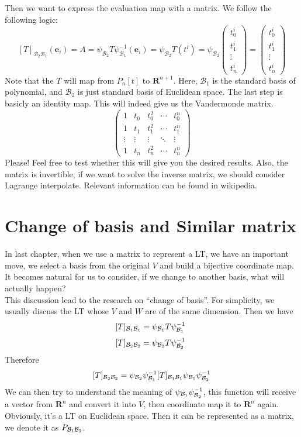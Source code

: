 Then we want to express the evaluation map with a matrix. We follow the following logic:
$$[T]_{\mathcal{B}_2\mathcal{B}_1}(\mathbf{e}_i) = A = \psi_{\mathcal{B}_2}T\psi_{\mathcal{B}_1}^{-1}(\mathbf{e}_i) = \psi_{\mathcal{B}_2}T(t^{i}) = \psi_{\mathcal{B}_2}\begin{pmatrix}
    t_0^i\\t_1^i \\ \vdots \\t_n^i
\end{pmatrix} = \begin{pmatrix}
    t_0^i\\t_1^i \\ \vdots \\t_n^i
\end{pmatrix}$$
Note that the $T$ will map from $P_n[t]$ to $\mathbf{R}^{n+1}$. Here, $\mathcal{B}_1$ is the standard basis of polynomial, and $\mathcal{B}_2$ is just standard basis of Euclidean space. The last step is basicly an identity map. This will indeed give us the Vandermonde matrix.\\
$$
\begin{pmatrix}
    1 & t_0 & t_0^2 & \cdots & t_0^n\\
    1 & t_1 & t_1^2 & \cdots & t_1^n\\
    \vdots & \vdots & \vdots & \ddots & \vdots\\
    1 & t_n & t_n^2 & \cdots & t_n^n
\end{pmatrix}
$$
Please! Feel free to test whether this will give you the desired results. Also, the matrix is invertible, if we want to solve the inverse matrix, we should consider Lagrange interpolate. Relevant information can be found in wikipedia.

\section{Change of basis and Similar matrix}

In last chapter, when we use a matrix to represent a LT, we have an important move, we select a basis from the original $V$ and build a bijective coordinate map. It becomes natural for us to consider, if we change to another basis, what will actually happen? \\

This discussion lead to the research on ``change of basis''. For simplicity, we usually discuss the LT whose $V$ and $W$ are of the same dimension. Then we have
$$[T]_{\B_1 \B_1} = \psi_{\B_1}T\psi_{\B_1}^{-1}\ $$
$$[T]_{\mathcal{B}_2 \mathcal{B}_2} = \psi_{\mathcal{B}_2}T\psi_{\mathcal{B}_2}^{-1}\ $$
Therefore
$$[T]_{\mathcal{B}_2 \mathcal{B}_2} = \psi_{\mathcal{B}_2}\psi_{\mathcal{B}_1}^{-1}[T]_{\mathcal{B}_1 \mathcal{B}_1}\psi_{\mathcal{B}_1}\psi_{\mathcal{B}_2}^{-1}$$
We can then try to understand the meaning of $\psi_{\mathcal{B}_1}\psi_{\mathcal{B}_2}^{-1}$, this function will receive a vector from $\mathbf{R}^n$ and convert it into $V$, then coordinate map it to $\mathbf{R}^n$ again. Obviously, it's a LT on Euclidean space. Then it can be represented as a matrix, we denote it as $P_{\mathcal{B}_1 \mathcal{B}_2}$.\\

